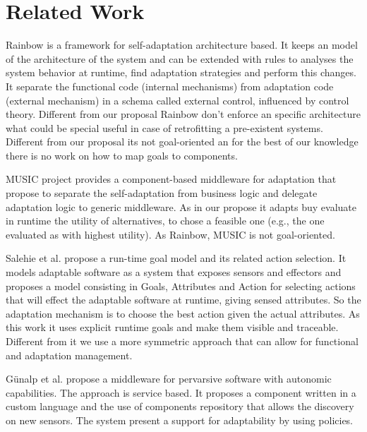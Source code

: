 \section{Related Work}
\label{related}


Rainbow is a framework for self-adaptation architecture based\cite{garlan_rainbow:_2004}. It keeps an model of the architecture of the system and can be extended with rules to analyses the system behavior at runtime, find adaptation strategies and perform this changes. It separate the functional  code (internal mechanisms) from adaptation code (external mechanism) in a schema called external control, influenced by control theory. \cite{garlan_software_2009}
Different from our proposal Rainbow don't enforce an specific architecture what could be special useful in case of retrofitting a pre-existent systems. Different from our proposal its not goal-oriented an for the best of our knowledge there is no work on how to map goals to  components.

MUSIC project provides a component-based middleware for adaptation that propose to separate the self-adaptation from business logic and delegate adaptation logic to generic middleware. As in our propose it adapts buy evaluate in runtime the utility of alternatives, to chose a feasible one (e.g., the one evaluated as with highest utility)\cite{rouvoy_music:_2009}. As Rainbow, MUSIC is not goal-oriented.

Salehie et al. \cite{salehie_towards_2012} propose a run-time goal model and its related
action selection. It models adaptable software as a system that exposes sensors and effectors and  proposes a model consisting in Goals, Attributes and Action for selecting actions that will effect the adaptable software at runtime, giving sensed attributes.
So the adaptation mechanism is to choose the best action given the actual attributes.
As this work it uses explicit runtime goals and make them visible and traceable.
Different from it we use a more symmetric approach that can allow for functional
and adaptation management.

Günalp et al. \cite{gunalp_autonomic_2012} propose a middleware for pervarsive software with autonomic capabilities. The approach is service based. It proposes a component written in a custom language and the use of components repository that allows the discovery on new sensors. The system present a support for adaptability by using policies.
